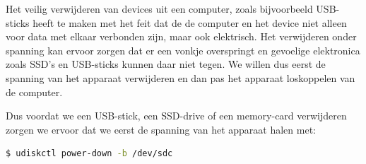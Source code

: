 Het veilig verwijderen van devices uit een computer, zoals bijvoorbeeld USB-sticks heeft te maken met het feit dat de de computer en het device niet alleen voor data met elkaar verbonden zijn, maar ook elektrisch. Het verwijderen onder spanning kan ervoor zorgen dat er een vonkje overspringt en gevoelige elektronica zoals SSD's en USB-sticks kunnen daar niet tegen. We willen dus eerst de spanning van het apparaat verwijderen en dan pas het apparaat loskoppelen van de computer.

Dus voordat we een USB-stick, een SSD-drive of een memory-card verwijderen zorgen we ervoor dat we eerst de spanning van het apparaat halen met:
\begin{lstlisting}[language=bash]
$ udiskctl power-down -b /dev/sdc
\end{lstlisting}

